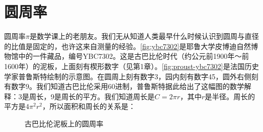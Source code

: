 \documentclass[b5paper]{ctexart}
\begin{document}
\section{圆周率}
圆周率$\pi$是数学课上的老朋友。我们无从知道人类最早什么时候认识到圆周与直径的比值是固定的，也许这来自测量的经验。\cref{fig:ybc7302}是耶鲁大学皮博迪自然博物馆中的一件藏品，编号YBC7302。这是古巴比伦时代（约公元前1900年～前1600年）的泥板，上面刻有楔形数字（见第1章）。\cref{fig:proust-ybc7302}是法国历史学家普鲁斯特绘制的示意图\cite{Proust-2016}。在圆周上刻有数字3，园内刻有数字45，圆外右侧刻有数字9。我们知道古巴比伦采用60进制，普鲁斯特据此给出了这幅图的数学解释：3是周长，9是周长的平方。我们知道周长是$C = 2\pi r$，其中$r$是半径。周长的平方是$4\pi^2 r^2$，所以面积和周长的关系是：

\begin{figure}[htbp]
 \centering
 \caption{古巴比伦泥板上的圆周率}
\end{figure}
\end{document}
